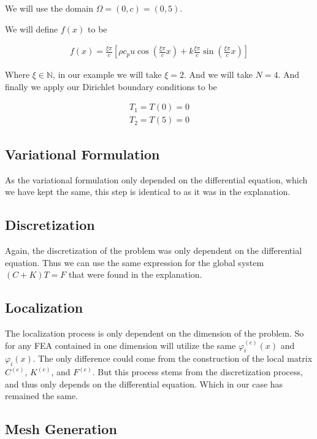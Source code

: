 \documentclass[10pt]{amsart}
\numberwithin{equation}{section}
\theoremstyle{definition}
\newcommand{\N}{\mathbb{N}}
\begin{document}
\begin{multicols}{2}
We will use the domain $\Omega=(0,c)=(0,5)$.

We will define $f(x)$ to be

\begin{align*}
  f(x)=\frac{\xi\pi}{c}\left[\rho c_p
  u\cos\left(\frac{\xi\pi}{c}x\right)+k\frac{\xi\pi}{c}\sin\left(\frac{\xi\pi}{c}x\right)\right]
\end{align*}

Where $\xi \in \N$, in our example we will take $\xi=2$. And we will take
$N=4$. And finally we apply our Dirichlet boundary conditions to be

\begin{align*}
  T_1=T(0)=0\\
  T_2=T(5)=0
\end{align*}

\subsection{Variational Formulation}%
\label{sub:variational_formulation}

As the variational formulation only depended on the differential equation,
which we have kept the same, this step is identical to as it was in the
explanation.

\subsection{Discretization}%
\label{sub:discretization}

Again, the discretization of the problem was only dependent on the differential
equation. Thus we can use the same expression for the global system $(C+K)T=F$
that were found in the explanation.

\subsection{Localization}%
\label{sub:localization}

The localization process is only dependent on the dimension of the problem. So
for any FEA contained in one dimension will utilize the same
$\varphi_i^{(e)}(x)$ and $\varphi_i(x)$. The only difference could come from
the construction of the local matrix $C^{(e)}$, $K^{(e)}$, and $F^{(e)}$. But
this process stems from the discretization process, and thus only depends on
the differential equation. Which in our case has remained the same.

\subsection{Mesh Generation}%
\label{sub:mesh_generation}


\end{multicols}
\end{document}
